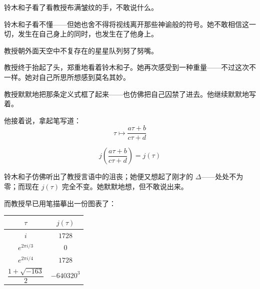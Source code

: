 铃木和子看了看教授布满皱纹的手，不敢说什么。


铃木和子看不懂——但她也舍不得将视线离开那些神谕般的符号。她不敢相信这一切，发生在自己身上的同时，也发生在了他身上。

教授朝外面天空中不复存在的星星队列努了努嘴。



教授终于抬起了头，郑重地看着铃木和子。她再次感受到一种重量——不过这次不一样。她对自己所思所想感到莫名其妙。


教授默默地把那条定义式框了起来——也仿佛把自己囚禁了进去。他继续默默地写着。

他接着说，拿起笔写道：
\[
\tau \mapsto \frac{a\tau+b}{c\tau+d}
\]

\[
j\!\left(\frac{a\tau+b}{c\tau+d}\right) = j(\tau)
\]


铃木和子仿佛听出了教授言语中的沮丧；她便又想起了刚才的 $\Delta$——处处不为零；而现在 $j(\tau)$ 完全不变。她默默地想，但不敢说出来。

而教授早已用笔描摹出一份图表了：

\begin{table}[h]
\centering
\renewcommand{\arraystretch}{1.2}
\begin{tabular}{cc}
\toprule
$\tau$ & $j(\tau)$ \\
\midrule
$i$ & $1728$ \\
$e^{2\pi i/3}$ & $0$ \\
$e^{2\pi i/4}$ & $1728$ \\
$\dfrac{1+\sqrt{-163}}{2}$ & $-640320^3$ \\
\bottomrule
\end{tabular}
\end{table}

